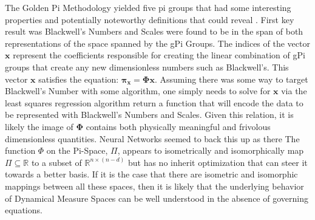 \documentclass{article}
\theoremstyle{definition}
\begin{document}
The Golden Pi Methodology yielded five pi groups that had some interesting properties and potentially noteworthy definitions that could reveal .  First key result was Blackwell's Numbers and Scales were found to be in the span of both representations of the space spanned by the gPi Groups.  The indices of the vector $\boldsymbol{x}$ represent the coefficients responsible for creating the linear combination of gPi groups that create any new dimensionless numbers such as Blackwell's.  This vector $\boldsymbol{x}$ satisfies the equation: $\boldsymbol{\pi}_{\boldsymbol{x}} = \boldsymbol{\Phi} \boldsymbol{x} $.  Assuming there was some way to target Blackwell's Number with some algorithm, one simply needs to solve for $\boldsymbol{x}$ via the least squares regression algorithm return a function that will encode the data to be represented with Blackwell's Numbers and Scales.  Given this relation, it is likely the image of $\boldsymbol{\Phi}$ contains both physically meaningful and frivolous dimensionless quantities.  Neural Networks seemed to back this up as there The function $\Phi$  on the Pi-Space, $\Pi$, appears to isometrically and isomorphically map $\Pi \subseteq \mathbb{R}  $ to a subset of $ \mathbb{R}^{n \times (n-d)}$ but has no inherit optimization that can steer it towards a better basis.  If it is the case that there are isometric and isomorphic mappings between all these spaces, then it is likely that the underlying behavior of Dynamical Measure Spaces can be well understood in the absence of governing equations.  


%
%
%
%
%
%
%
%




\end{document}
